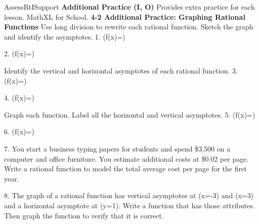 \documentclass{article}
\newenvironment{te-addendum}[2]{}{}     %
\newcommand{\answer}[1]{}               %
\newcommand{\placeholder}[2]{}          %
\newcommand{\te}[1]{}                   %
\begin{document}
\begin{te-addendum}{Assess}{RtISupport}
\textbf{Additional Practice (I, O)} Provides extra practice for each lesson. MathXL for School.
\textbf{4-2 Additional Practice: Graphing Rational Functions}
Use long division to rewrite each rational function. Sketch the graph and identify the asymptotes.
1. (f(x)=)
\answer{(f(x)=-\frac2{x+1}+2); (x=-1); (y=2)}
\placeholder{graph}{Additional1 magenta 2x/(x+1), axes x,y,O and magenta unit labels x -8,-4,4,8; grid2, window -10 to10 both. Dashed x=-1,y2, two arrowed branches; crosses origin; no marked points.}
2. (f(x)=)
\answer{(f(x)=\frac2{x^2-1}+2); (x=\pm1); (y=2)}
\placeholder{graph}{Additional2 magenta 2x^2/(x^2-1), axes x,y,O, window -10 to10 both, grid2; x labels -8,-4,4,8, y labels partly obscured by branches. Dashed x=-1,1 and y2; two outer branches above2, middle inverted arch touches origin, six branch arrows.}
Identify the vertical and horizontal asymptotes of each rational function.
3. (f(x)=)
\answer{(x=\pm0.5); (y=0.5)}
4. (f(x)=)
\answer{(x=\pm3); (y=2)}
\te{Printed answer includes x=-3 although (x+3) cancels; x=-3 is a hole, while x=3 is the vertical asymptote.}
Graph each function. Label all the horizontal and vertical asymptotes.
5. (f(x)=)
\answer{See graph; labels (x=5.5), (y=0), (x=-0.6).}
\placeholder{graph}{Additional5 printed magenta three-branch graph, axes x,y,O; grid2, window approximately x -8 to12,y -10 to10; labels x -4,8 and y -8,-4,4,8. Vertical asymptotes labeled x5.5 and x=-0.6, horizontal y0 labeled; arrows. Middle curve as printed lies well below x-axis, descends toward x5.5; outer branches approach y0.}
6. (f(x)=)
\answer{See graph; labels (x=-1), (y=0.5), (x=6).}
\placeholder{graph}{Additional6 magenta rational curve, axes x,y,O; grid2, window x -6 to14,y -10 to10; labels x -4,4,8,12. Dashed asymptotes with callouts x=-1,y0.5,x6. Three arrowed branches, middle rises from negative infinity at -1 to positive infinity at6, outer tails near0.5.}
7. You start a business typing papers for students and spend \$3,500 on a computer and office furniture. You estimate additional costs at \$0.02 per page. Write a rational function to model the total average cost per page for the first year.
\answer{(f(x)=\frac{0.02x+3500}{x})}
8. The graph of a rational function has vertical asymptotes at (x=-3) and (x=3) and a horizontal asymptote at (y=1). Write a function that has those attributes. Then graph the function to verify that it is correct.
\answer{Sample answer: (f(x)=\frac{x^2-1}{x^2-9})}
\placeholder{graph}{Additional8 magenta (x^2-1)/(x^2-9), axes x,y,O; grid2, window -10 to10 both; labels x -8,-4,4,8 and y -8,-4,4,8. Dashed x=-3,3,y1; outside U-like positive branches, middle inverted arch crossing x=-1,1, six end arrows. No marked points.}
\end{te-addendum}
\end{document}
